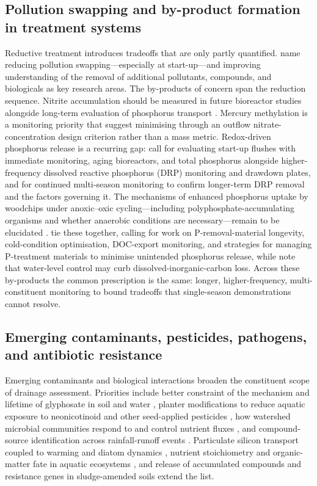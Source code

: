 \documentclass[11pt]{article}
\begin{document}
\subsection{Pollution swapping and by-product formation in treatment systems}

Reductive treatment introduces tradeoffs that are only partly quantified.
\textcite{Christianson2021} name reducing pollution swapping---especially at
start-up---and improving understanding of the removal of additional pollutants,
compounds, and biologicals as key research areas. The by-products of concern
span the reduction sequence. Nitrite accumulation should be measured in future
bioreactor studies alongside long-term evaluation of phosphorus transport
\parencite{Bell2015}. Mercury methylation is a monitoring priority that
\textcite{Maxwell2022} suggest minimising through an outflow
nitrate-concentration design criterion rather than a mass metric. Redox-driven
phosphorus release is a recurring gap: \textcite{Bailon2025} call for evaluating
start-up flushes with immediate monitoring, aging bioreactors, and total
phosphorus alongside higher-frequency dissolved reactive phosphorus (DRP)
monitoring and drawdown plates, and \textcite{Rivas2020} for continued
multi-season monitoring to confirm longer-term DRP removal and the factors
governing it. The mechanisms of enhanced phosphorus uptake by woodchips under
anoxic--oxic cycling---including polyphosphate-accumulating organisms and whether
anaerobic conditions are necessary---remain to be elucidated
\parencite{Zhang2024b}. \textcite{Strock2025} tie these together, calling for
work on P-removal-material longevity, cold-condition optimisation, DOC-export
monitoring, and strategies for managing P-treatment materials to minimise
unintended phosphorus release, while \textcite{Schilling2023} note that
water-level control may curb dissolved-inorganic-carbon loss. Across these
by-products the common prescription is the same: longer, higher-frequency,
multi-constituent monitoring to bound tradeoffs that single-season demonstrations
cannot resolve.

\subsection{Emerging contaminants, pesticides, pathogens, and antibiotic resistance}

Emerging contaminants and biological interactions broaden the constituent scope
of drainage assessment. Priorities include better constraint of the mechanism
and lifetime of glyphosate in soil and water \parencite{Spiese2023}, planter
modifications to reduce aquatic exposure to neonicotinoid and other seed-applied
pesticides \parencite{Schaafsma2019}, how watershed microbial communities respond
to and control nutrient fluxes \parencite{Knorr2023}, and compound-source
identification across rainfall-runoff events \parencite{Fraindová2022}.
Particulate silicon transport coupled to warming and diatom dynamics
\parencite{Sethna2022}, nutrient stoichiometry and organic-matter fate in aquatic
ecosystems \parencite{Manninen2023,Manninen2018}, and release of accumulated
compounds and resistance genes in sludge-amended soils \parencite{Ghirardini2019}
extend the list.
\end{document}
